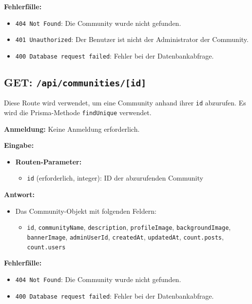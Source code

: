 \documentclass[a4paper,12pt]{article}
\begin{document}
\textbf{Fehlerfälle:}
\begin{itemize}
    \item \texttt{404 Not Found}:
        Die Community wurde nicht gefunden.
    \item \texttt{401 Unauthorized}:
        Der Benutzer ist nicht der Administrator der Community.
    \item \texttt{400 Database request failed}:
        Fehler bei der Datenbankabfrage.
\end{itemize}

\newpage
\subsection{GET: \texttt{/api/communities/[id]}}

Diese Route wird verwendet, um eine Community anhand ihrer \texttt{id}
abzurufen. Es wird die Prisma-Methode \texttt{findUnique} verwendet.

\textbf{Anmeldung:} Keine Anmeldung erforderlich.

\textbf{Eingabe:}
\begin{itemize}
    \item \textbf{Routen-Parameter:}
    \begin{itemize}
        \item \texttt{id} (erforderlich, integer):
            ID der abzurufenden Community
    \end{itemize}
\end{itemize}

\textbf{Antwort:}
\begin{itemize}
    \item Das Community-Objekt mit folgenden Feldern:
    \begin{itemize}
        \item \texttt{id},
              \texttt{communityName},
              \texttt{description},
              \texttt{profileImage},
              \texttt{backgroundImage},
              \texttt{bannerImage},
              \texttt{adminUserId},
              \texttt{createdAt},
              \texttt{updatedAt},
              \texttt{count.posts},
              \texttt{count.users}
    \end{itemize}
\end{itemize}

\textbf{Fehlerfälle:}
\begin{itemize}
    \item \texttt{404 Not Found}:
        Die Community wurde nicht gefunden.
    \item \texttt{400 Database request failed}:
        Fehler bei der Datenbankabfrage.
\end{itemize}
\end{document}
